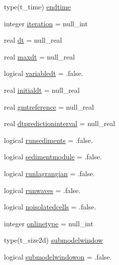 \begin{DoxyCompactItemize}
\item 
type(t\+\_\+time) \mbox{\hyperlink{structmodulemodel_1_1t__model_ac477a7ea662a0d49bd6b48e49e1dd5b7}{endtime}}
\item 
integer \mbox{\hyperlink{structmodulemodel_1_1t__model_ada8bbe29caa1111f8ef4f6ca77d2c2d9}{iteration}} = null\+\_\+int
\item 
real \mbox{\hyperlink{structmodulemodel_1_1t__model_a6c8c248ac9b3151ccf360c14bc020186}{dt}} = null\+\_\+real
\item 
real \mbox{\hyperlink{structmodulemodel_1_1t__model_a94584a739b465a36530b413d47310174}{maxdt}} = null\+\_\+real
\item 
logical \mbox{\hyperlink{structmodulemodel_1_1t__model_a3a000261c5ac1d20133ba98bf28a4df7}{variabledt}} = .false.
\item 
real \mbox{\hyperlink{structmodulemodel_1_1t__model_aeba928d6993cf650ab83a627955c142f}{initialdt}} = null\+\_\+real
\item 
real \mbox{\hyperlink{structmodulemodel_1_1t__model_aaf300d649c20292836cb3cd77ea1d852}{gmtreference}} = null\+\_\+real
\item 
real \mbox{\hyperlink{structmodulemodel_1_1t__model_ac98949e1b6377190bbc08ae30111e3cb}{dtpredictioninterval}} = null\+\_\+real
\item 
logical \mbox{\hyperlink{structmodulemodel_1_1t__model_a6d068134cc4997c9b8416f3ab205fde2}{runsediments}} = .false.
\item 
logical \mbox{\hyperlink{structmodulemodel_1_1t__model_af1fa18b3f782b24ad401055503c0c04f}{sedimentmodule}} = .false.
\item 
logical \mbox{\hyperlink{structmodulemodel_1_1t__model_a8c946e626564dbdbb58864a9330799a8}{runlagrangian}} = .false.
\item 
logical \mbox{\hyperlink{structmodulemodel_1_1t__model_aa9d4b05e334372d1874959db08c1d446}{runwaves}} = .false.
\item 
logical \mbox{\hyperlink{structmodulemodel_1_1t__model_a7f1ad14f9e74371398cd033eea1e24df}{noisolatedcells}} = .false.
\item 
integer \mbox{\hyperlink{structmodulemodel_1_1t__model_ae8d260226fc98ca6f16fffc7820dfa78}{onlinetype}} = null\+\_\+int
\item 
type(t\+\_\+size2d) \mbox{\hyperlink{structmodulemodel_1_1t__model_aafc35a66d6b0c91ae89ff27f69c96899}{submodelwindow}}
\item 
logical \mbox{\hyperlink{structmodulemodel_1_1t__model_ab741279a37ae895ad6bcca72c9679935}{submodelwindowon}} = .false.

\end{DoxyCompactItemize}
